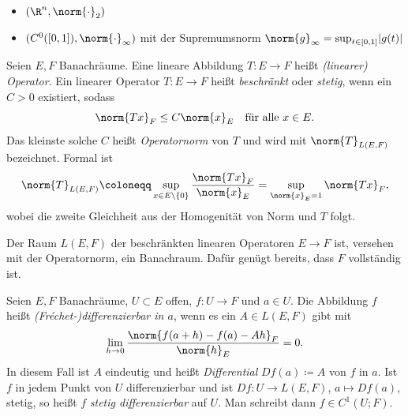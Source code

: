 \documentclass[11pt]{article}
\begin{document}
\begin{example}
  \begin{itemize}
    \item $(\R^n, \norm{\cdot}_2)$
    \item $(C^0([0,1]), \norm{\cdot}_{\infty})$ mit der Supremumsnorm $\norm{g}_\infty = \sup_{t \in [0,1]} \lvert g(t) \rvert$
  \end{itemize}
\end{example}

\begin{definition}\Theorem
  Seien $E, F$ Banachräume. Eine lineare Abbildung $T\colon E \to F$ heißt \emph{(linearer) Operator}.
  Ein linearer Operator $T\colon E \to F$ heißt \emph{beschränkt} oder \emph{stetig}, wenn ein $C > 0$ existiert, sodass
  \[ \norm{Tx}_F \le C \norm{x}_E \quad \text{für alle } x \in E. \]
  Das kleinste solche $C$ heißt \emph{Operatornorm} von $T$ und wird mit $\norm{T}_{L(E,F)}$ bezeichnet. Formal ist
  \[
    \norm{T}_{L(E,F)} \coloneqq \sup_{x \in E \setminus \{0\}} \frac{\norm{Tx}_F}{\norm{x}_E} = \sup_{\norm{x}_E = 1} \norm{Tx}_F,
  \]
  wobei die zweite Gleichheit aus der Homogenität von Norm und $T$ folgt.
\end{definition}

\begin{note}
  Der Raum $L(E,F)$ der beschränkten linearen Operatoren $E \to F$ ist, versehen mit der Operatornorm, ein Banachraum. Dafür genügt bereits, dass $F$ vollständig ist.
\end{note}


\begin{ergaenzung}
\begin{definition}[Differenzierbarkeit]\Theorem
  Seien $E, F$ Banachräume, $U \subset E$ offen, $f\colon U \to F$ und $a \in U$. Die Abbildung $f$ heißt \emph{(Fréchet-)differenzierbar in $a$}, wenn es ein $A \in L(E,F)$ gibt mit
  \[ \lim_{h \to 0} \frac{\norm{f(a+h) - f(a) - Ah}_F}{\norm{h}_E} = 0. \]
  In diesem Fall ist $A$ eindeutig und heißt \emph{Differential} $Df(a) \coloneqq A$ von $f$ in $a$.
  Ist $f$ in jedem Punkt von $U$ differenzierbar und ist $Df\colon U \to L(E,F)$, $a \mapsto Df(a)$, stetig, so heißt $f$ \emph{stetig differenzierbar} auf $U$. Man schreibt dann $f \in C^1(U; F)$.
\end{definition}
\end{ergaenzung}
\end{document}
